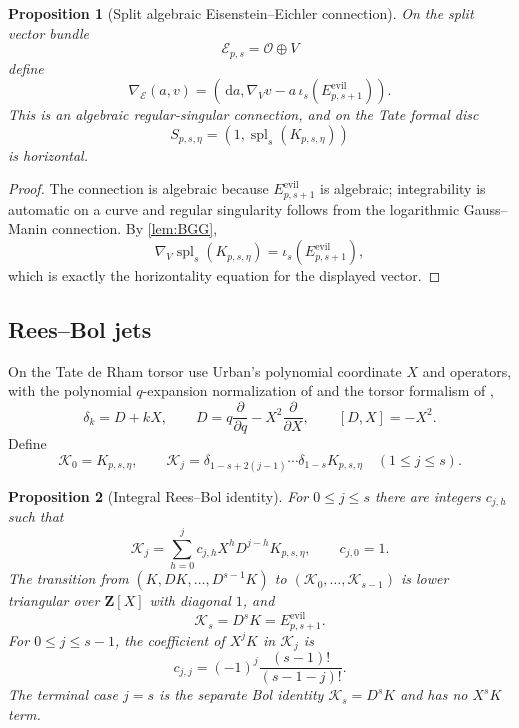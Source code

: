 \documentclass[11pt]{article}
\newtheorem{proposition}[proposition]{Proposition}
\theoremstyle{definition}
\theoremstyle{remark}
\newcommand{\Z}{\mathbf Z}
\newcommand{\dd}{\,\mathrm d}
\newcommand{\calE}{\mathcal E}
\newcommand{\calK}{\mathcal K}
\newcommand{\calO}{\mathcal O}
\begin{document}
\begin{proposition}[Split algebraic Eisenstein--Eichler connection]
\label{prop:split-extension}
On the split vector bundle
\[
 \calE_{p,s}=\calO\oplus V
\]
define
\begin{equation}\label{eq:extension-connection}
 \nabla_{\calE}(a,v)=
 \left(\dd a,\nabla_Vv-a\,\iota_s(E_{p,s+1}^{\mathrm{evil}})\right).
\end{equation}
This is an algebraic regular-singular connection, and on the Tate formal disc
\[
 S_{p,s,\eta}=
 \left(1,\operatorname{spl}_s(K_{p,s,\eta})\right)
\]
is horizontal.
\end{proposition}

\begin{proof}
The connection is algebraic because $E_{p,s+1}^{\mathrm{evil}}$ is algebraic;
integrability is automatic on a curve and regular singularity follows from the
logarithmic Gauss--Manin connection.  By \cref{lem:BGG},
\[
 \nabla_V\operatorname{spl}_s(K_{p,s,\eta})
 =\iota_s(E_{p,s+1}^{\mathrm{evil}}),
\]
which is exactly the horizontality equation for the displayed vector.
\end{proof}

\subsection{Rees--Bol jets}

On the Tate de Rham torsor use Urban's polynomial coordinate $X$ and
operators, with the polynomial $q$-expansion normalization of
\cite[Proposition~2.4.1 and Remark~2.4.2]{Urban2013} and the torsor
formalism of \cite{GPRJ2025},
\[
 \delta_k=D+kX,
 \qquad
 D=q\frac{\partial}{\partial q}-X^2\frac{\partial}{\partial X},
 \qquad[D,X]=-X^2.
\]
Define
\[
 \calK_0=K_{p,s,\eta},
 \qquad
 \calK_j=
 \delta_{1-s+2(j-1)}\cdots\delta_{1-s}K_{p,s,\eta}
 \quad(1\le j\le s).
\]

\begin{proposition}[Integral Rees--Bol identity]\label{prop:Rees-Bol}
For $0\le j\le s$ there are integers $c_{j,h}$ such that
\begin{equation}\label{eq:Rees-Bol}
 \calK_j=\sum_{h=0}^jc_{j,h}X^hD^{j-h}K_{p,s,\eta},
 \qquad c_{j,0}=1.
\end{equation}
The transition from
$(K,DK,\ldots,D^{s-1}K)$ to
$(\calK_0,\ldots,\calK_{s-1})$ is lower triangular over $\Z[X]$
with diagonal $1$, and
\[
 \calK_s=D^sK=E_{p,s+1}^{\mathrm{evil}}.
\]
For $0\le j\le s-1$, the coefficient of $X^jK$ in $\calK_j$ is
\begin{equation}\label{eq:top-cj}
 \boxed{c_{j,j}=(-1)^j\frac{(s-1)!}{(s-1-j)!}.}
\end{equation}
The terminal case $j=s$ is the separate Bol identity
$\calK_s=D^sK$ and has no $X^sK$ term.
\end{proposition}
\end{document}
